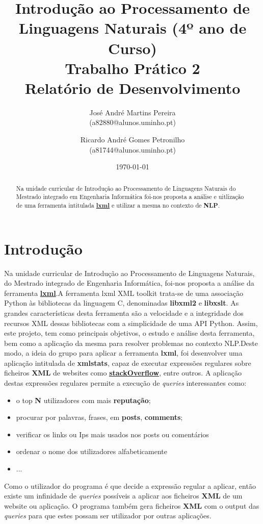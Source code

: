 \documentclass[11pt,a4paper]{report}%
\title{Introdução ao Processamento de Linguagens Naturais (4º ano de Curso)\\
       \textbf{Trabalho Prático 2}\\ Relatório de Desenvolvimento
       } %
\author{José André Martins Pereira\\ (a82880@alunos.uminho.pt) \and Ricardo André Gomes Petronilho\\ (a81744@alunos.uminho.pt)
       } %
\date{\today} %
\begin{document}
\maketitle %

\begin{abstract}  %
Na unidade curricular de Introdução ao Processamento de Linguagens Naturais do Mestrado integrado em Engenharia Informática foi-nos proposta a análise e uitlização de uma ferramenta intitulada \textbf{\href{https://lxml.de/index.html}{lxml}} e utilizar a mesma no contexto de \textbf{NLP}.
\end{abstract}

\tableofcontents %

\chapter{Introdução} \label{chap:intro} %
Na unidade curricular de Introdução ao Processamento de Linguagens Naturais, do Mestrado integrado de Engenharia Informática, foi-nos proposta a análise da ferramenta \textbf{\href{https://lxml.de/index.html}{lxml}}.\newline A ferramenta lxml XML toolkit trata-se de uma associação Python às bibliotecas da linguagem C, denominadas \textbf{libxml2} e  \textbf{libxslt}. As grandes características desta ferramenta são a velocidade e a integridade dos recursos XML dessas bibliotecas com a simplicidade de uma API Python. \newline Assim, este projeto, tem como principais objetivos, o estudo e análise desta ferramenta, bem como a aplicação da mesma para resolver problemas no contexto  NLP.\newline Deste modo, a ideia do grupo para aplicar a ferramenta \textbf{lxml}, foi desenvolver uma aplicação intitulada de \textbf{xmlstats}, capaz de executar expressões regulares sobre ficheiros \textbf{XML} de websites como \textbf{\href{https://pt.stackoverflow.com}{stackOverflow}}, entre outros. A aplicação destas expressões regulares permite a execução de \emph{queries} interessantes como:
\begin{itemize}
    \item o top \textbf{N} utilizadores com mais \textbf{reputação};
    \item procurar por palavras, frases, em \textbf{posts}, \textbf{comments};
    \item verificar os links ou Ips mais usados nos posts ou comentários
    \item ordenar o nome dos utilizadores alfabeticamente
    \item ...
\end{itemize}{}
Como o utilizador do programa é que decide a expressão regular a aplicar, então existe um infinidade de \emph{queries} possíveis a aplicar aos ficheiros \textbf{XML} de um website ou aplicação. \newline O programa também gera ficheiros \textbf{XML} com o output das \emph{queries} para que estes possam ser utilizador por outras aplicações.
\end{document}
